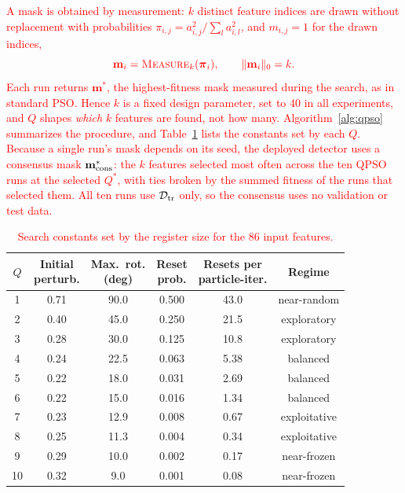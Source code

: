 \documentclass[conference]{IEEEtran}
\begin{document}
\textcolor{red}{A mask is obtained by measurement: $k$
distinct feature indices are drawn without replacement with
probabilities $\pi_{i,j}=a_{i,j}^{2}/\sum_{l}a_{i,l}^{2}$, and
$m_{i,j}=1$ for the drawn indices,}
\begin{equation}
\textcolor{red}{\mathbf{m}_i = \textsc{Measure}_k(\boldsymbol{\pi}_i),
\qquad \|\mathbf{m}_i\|_0 = k .}
\label{eq:qpso_measure}
\end{equation}
\textcolor{red}{Each run returns $\mathbf{m}^{*}$, the
highest-fitness mask measured during the search, as in standard PSO.
Hence $k$ is a fixed design parameter, set to 40 in all experiments,
and $Q$ shapes \emph{which} $k$ features are found, not how many.
Algorithm~\ref{alg:qpso} summarizes the procedure, and
Table~\ref{tab:q_constants} lists the constants set by each $Q$.}
\textcolor{red}{Because a single run's mask depends on its
seed, the deployed detector uses a consensus mask
$\mathbf{m}^{*}_{\rm cons}$: the $k$ features selected most often
across the ten QPSO runs at the selected $Q^{*}$, with ties broken by
the summed fitness of the runs that selected them. All ten runs use
$\mathcal{D}_{\rm tr}$ only, so the consensus uses no validation or
test data.}

\begin{table}[!t]
\centering
\scriptsize
\caption{\textcolor{red}{Search constants set by the
register size for the 86 input features.}}
\label{tab:q_constants}
\setlength{\tabcolsep}{4pt}
\renewcommand{\arraystretch}{1.05}
\color{red}
\begin{tabular}{cccccc}
\hline\toprule
$Q$ & \makecell{Initial\\perturb.} & \makecell{Max.\ rot.\\(deg)} & \makecell{Reset\\prob.} & \makecell{Resets per\\particle-iter.} & Regime \\
\hline\toprule
1  & 0.71 & 90.0 & 0.500  & 43.0 & near-random \\
2  & 0.40 & 45.0 & 0.250  & 21.5 & exploratory \\
3  & 0.28 & 30.0 & 0.125  & 10.8 & exploratory \\
4  & 0.24 & 22.5 & 0.063  & 5.38 & balanced \\
5  & 0.22 & 18.0 & 0.031  & 2.69 & balanced \\
6  & 0.22 & 15.0 & 0.016  & 1.34 & balanced \\
7  & 0.23 & 12.9 & 0.008  & 0.67 & exploitative \\
8  & 0.25 & 11.3 & 0.004  & 0.34 & exploitative \\
9  & 0.29 & 10.0 & 0.002  & 0.17 & near-frozen \\
10 & 0.32 & 9.0  & 0.001  & 0.08 & near-frozen \\
\hline\toprule
\end{tabular}
\end{table}
\end{document}

